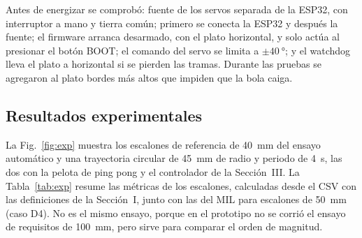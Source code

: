 Antes de energizar se comprobó: fuente de los servos separada de la ESP32, con interruptor a
mano y tierra común; primero se conecta la ESP32 y después la fuente; el firmware arranca
desarmado, con el plato horizontal, y solo actúa al presionar el botón BOOT; el comando del servo
se limita a $\pm\SI{40}{\degree}$; y el watchdog lleva el plato a horizontal si se pierden las
tramas. Durante las pruebas se agregaron al plato bordes más altos que impiden que la bola caiga.

\subsection{Resultados experimentales}

La Fig.~\ref{fig:exp} muestra los escalones de referencia de \SI{40}{\milli\metre} del ensayo
automático y una trayectoria circular de \SI{45}{\milli\metre} de radio y periodo de
\SI{4}{\second}, las dos con la pelota de ping pong y el controlador de la Sección~III. La
Tabla~\ref{tab:exp} resume las métricas de los escalones, calculadas desde el CSV con las
definiciones de la Sección~I, junto con las del MIL para escalones de \SI{50}{\milli\metre} (caso
D4). No es el mismo ensayo, porque en el prototipo no se corrió el ensayo de requisitos de
\SI{100}{\milli\metre}, pero sirve para comparar el orden de magnitud.

